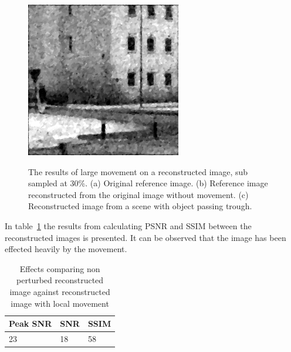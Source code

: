 \begin{figure}[H]
\begin{minipage}[t]{0.32\textwidth}
    \subcaption{}
    \label{fig:fly_2}
\end{minipage}
\begin{minipage}[t]{0.32\textwidth}
    \includegraphics[width = \textwidth]{result/dynamic/fly/flyby_1sec_res_psnr_23_snr_18_sssim_58.png}
    \subcaption{}
    \label{fig:fly_3}
\end{minipage}
    \caption{The results of large movement on a reconstructed image, sub sampled at 30\%. (a) Original reference image. (b) Reference image reconstructed from the original image without movement. (c) Reconstructed image from a scene with object passing trough.}
    \label{fig:fly_dyn}
\end{figure}

In table~\ref{tab:fly_dyn} the results from calculating PSNR and SSIM between the reconstructed images is presented. It can be observed that the image has been effected heavily by the movement. 


\begin{table}[H]
    \centering
  \begin{tabular}{ | l | l | l |}
    \hline
    Peak SNR & SNR & SSIM \\ \hline
    23 & 18 & 58 \\ 
    \hline
  \end{tabular}
      \caption{Effects comparing non perturbed reconstructed image against reconstructed image with local movement}
    \label{tab:fly_dyn}
\end{table}



